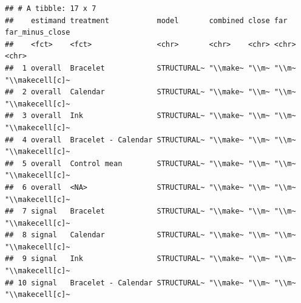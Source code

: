 \documentclass[
]{article}
\begin{document}
\begin{verbatim}
## # A tibble: 17 x 7
##    estimand treatment           model       combined close far   far_minus_close
##    <fct>    <fct>               <chr>       <chr>    <chr> <chr> <chr>          
##  1 overall  Bracelet            STRUCTURAL~ "\\make~ "\\m~ "\\m~ "\\makecell[c]~
##  2 overall  Calendar            STRUCTURAL~ "\\make~ "\\m~ "\\m~ "\\makecell[c]~
##  3 overall  Ink                 STRUCTURAL~ "\\make~ "\\m~ "\\m~ "\\makecell[c]~
##  4 overall  Bracelet - Calendar STRUCTURAL~ "\\make~ "\\m~ "\\m~ "\\makecell[c]~
##  5 overall  Control mean        STRUCTURAL~ "\\make~ "\\m~ "\\m~ "\\makecell[c]~
##  6 overall  <NA>                STRUCTURAL~ "\\make~ "\\m~ "\\m~ "\\makecell[c]~
##  7 signal   Bracelet            STRUCTURAL~ "\\make~ "\\m~ "\\m~ "\\makecell[c]~
##  8 signal   Calendar            STRUCTURAL~ "\\make~ "\\m~ "\\m~ "\\makecell[c]~
##  9 signal   Ink                 STRUCTURAL~ "\\make~ "\\m~ "\\m~ "\\makecell[c]~
## 10 signal   Bracelet - Calendar STRUCTURAL~ "\\make~ "\\m~ "\\m~ "\\makecell[c]~

\end{verbatim}
\end{document}
